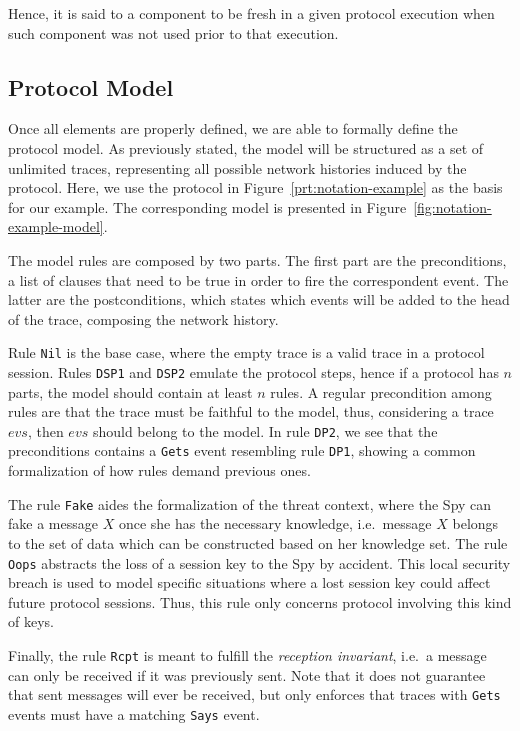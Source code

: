 Hence, it is said to a component to be fresh in a given protocol execution when such component was not used prior to that execution.


\subsection{Protocol Model}
Once all elements are properly defined, we are able to formally define the protocol model. As previously stated, the model will be structured as a set of unlimited traces, representing all possible network histories induced by the protocol. Here, we use the protocol in Figure~\ref{prt:notation-example} as the basis for our example. The corresponding model is presented in Figure~\ref{fig:notation-example-model}.

The model rules are composed by two parts. The first part are the preconditions, a list of clauses that need to be true in order to fire the correspondent event. The latter are the postconditions, which states which events will be added to the head of the trace, composing the network history.

Rule \texttt{Nil} is the base case, where the empty trace is a valid trace in a protocol session. Rules \texttt{DSP1} and \texttt{DSP2} emulate the protocol steps, hence if a protocol has \(n\) parts, the model should contain at least \(n\) rules. A regular precondition among rules are that the trace must be faithful to the model, thus, considering a trace \(evs\), then \(evs\) should belong to the model. In rule \texttt{DP2}, we see that the preconditions contains a \texttt{Gets} event resembling rule \texttt{DP1}, showing a common formalization of how rules demand previous ones.

The rule \texttt{Fake} aides the formalization of the threat context, where the Spy can fake a message \(X\) once she has the necessary knowledge, i.e.\ message \(X\) belongs to the set of data which can be constructed based on her knowledge set. The rule \texttt{Oops} abstracts the loss of a session key to the Spy by accident. This local security breach is used to model specific situations where a lost session key could affect future protocol sessions. Thus, this rule only concerns protocol involving this kind of keys.

Finally, the rule \texttt{Rcpt} is meant to fulfill the \textit{reception invariant}, i.e.\ a message can only be received if it was previously sent. Note that it does not guarantee that sent messages will ever be received, but only enforces that traces with \texttt{Gets} events must have a matching \texttt{Says} event.

